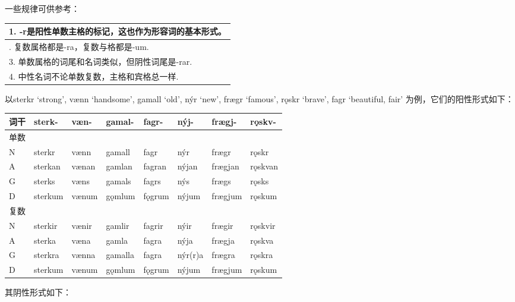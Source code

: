 一些规律可供参考：

\begin{longtable}{l}
  \toprule
  1. -r是阳性单数主格的标记，这也作为形容词的基本形式。 \\
  \midrule
  \endhead
  \bottomrule
  \endfoot
  2. 复数属格都是-ra，复数与格都是-um.       \\
  3. 单数属格的词尾和名词类似，但阴性词尾是-rar.   \\
  4. 中性名词不论单数复数，主格和宾格总一样.       \\
\end{longtable}

以sterkr `strong‌', vænn `handsome‌', gamall `old‌', nýr `new‌', frægr
`famous‌', rǫskr `brave‌', fagr `beautiful, fair'
为例，它们的阳性形式如下：

\begin{longtable}{llllllll}
  \toprule
  词干 & sterk-  & væn-  & gamal-  & fagr-  & nýj-    & frægj-  & rǫskv-  \\
  \midrule
  \endhead
  \bottomrule
  \endfoot
  单数 &         &       &         &        &         &         &         \\
  N  & sterkr  & vænn  & gamall  & fagr   & nýr     & frægr   & rǫskr   \\
  A  & sterkan & vænan & gamlan  & fagran & nýjan   & frægjan & rǫskvan \\
  G  & sterks  & væns  & gamals  & fagrs  & nýs     & frægs   & rǫsks   \\
  D  & sterkum & vænum & gǫmlum  & fǫgrum & nýjum   & frægjum & rǫskum  \\
  复数 &         &       &         &        &         &         &         \\
  N  & sterkir & vænir & gamlir  & fagrir & nýir    & frægir  & rǫskvir \\
  A  & sterka  & væna  & gamla   & fagra  & nýja    & frægja  & rǫskva  \\
  G  & sterkra & vænna & gamalla & fagra  & nýr(r)a & frægra  & rǫskra  \\
  D  & sterkum & vænum & gǫmlum  & fǫgrum & nýjum   & frægjum & rǫskum  \\
\end{longtable}

其阴性形式如下：

